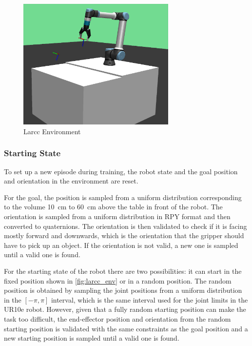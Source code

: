 \begin{figure}[H]%
    \centerline{\includegraphics[width=0.7\textwidth]{figs/larcc_env.png}}
    \caption[Larcc Environment]{Larcc Environment}
    \label{fig:larcc_env}
\end{figure}

\subsubsection{Starting State}

To set up a new episode during training, the robot state and the goal position and orientation in the environment are reset.

For the goal, the position is sampled from a uniform distribution corresponding to the volume \SI{10}{\cm} to \SI{60}{\cm} above the table in front of the robot. The orientation is sampled from a uniform distribution in RPY format and then converted to quaternions. The orientation is then validated to check if it is facing mostly forward and downwards, which is the orientation that the gripper should have to pick up an object. If the orientation is not valid, a new one is sampled until a valid one is found.

For the starting state of the robot there are two possibilities: it can start in the fixed position shown in \autoref{fig:larcc_env} or in a random position. The random position is obtained by sampling the joint positions from a uniform distribution in the $[-\pi, \pi]$ interval, which is the same interval used for the joint limits in the UR10e robot. However, given that a fully random starting position can make the task too difficult, the end-effector position and orientation from the random starting position is validated with the same constraints as the goal position and a new starting position is sampled until a valid one is found.

